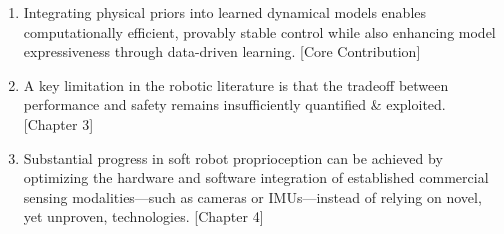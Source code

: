 \documentclass{propositions}
\begin{document}
\begin{enumerate}
    \item %
    Integrating physical priors into learned dynamical models enables computationally efficient, provably stable control while also enhancing model expressiveness through data-driven learning.
    [Core Contribution]
    \item %
    A key limitation in the robotic literature is that the tradeoff between performance and safety remains insufficiently quantified \& exploited. [Chapter 3]
    \item %
    Substantial progress in soft robot proprioception can be achieved by optimizing the hardware and software integration of established commercial sensing modalities—such as cameras or IMUs—instead of relying on novel, yet unproven, technologies.
    [Chapter 4]

\end{enumerate}
\end{document}
